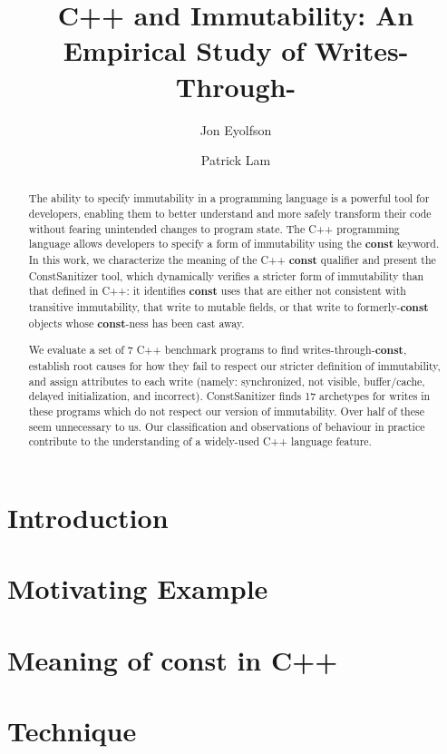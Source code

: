 \documentclass[a4paper, UKenglish]{lipics-v2016}
\title{C++ \const{} and Immutability: An Empirical Study of Writes-Through-\const{}}
\author[1]{Jon Eyolfson}
\author[2]{Patrick Lam}
\affil[1]{University of Waterloo\\
  Waterloo, ON, Canada\\
  \texttt{jeyolfso@uwaterloo.ca}}
\affil[2]{University of Waterloo\\
  Waterloo ON, Canada\\
  \texttt{patrick.lam@uwaterloo.ca}}
\newcommand{\const}{{\bfseries \ttfamily const}}
\newcommand{\wstc}{writes-through-\const{}}
\begin{document}
\maketitle

\begin{abstract}
The ability to specify immutability in a programming language is a powerful tool
for developers, enabling them to better understand and more safely transform
their code without fearing unintended changes to program state.
The C++ programming language allows developers to specify a form of immutability
using the \const{} keyword.
In this work, we characterize the meaning of the C++ \const{} qualifier and
present the ConstSanitizer tool, which dynamically verifies a stricter form of
immutability than that defined in C++: it identifies \const{} uses that are
either not consistent with transitive immutability, that write to mutable
fields, or that write to formerly-\const{} objects whose \const{}-ness has been
cast away.

We evaluate a set of 7 C++ benchmark programs to find \wstc{}, establish root
causes for how they fail to respect our stricter definition of immutability, and
assign attributes to each write (namely: synchronized, not visible,
buffer/cache, delayed initialization, and incorrect).
ConstSanitizer finds 17 archetypes for writes in these programs which do not
respect our version of immutability.
Over half of these seem unnecessary to us.
Our classification and observations of behaviour in practice contribute to the
understanding of a widely-used C++ language feature.
\end{abstract}

\section{Introduction}


\section{Motivating Example}
\label{section:motivating-example}


\section{Meaning of \const{} in C++}
\label{section:background}


\section{Technique}
\label{section:technique}

\end{document}
